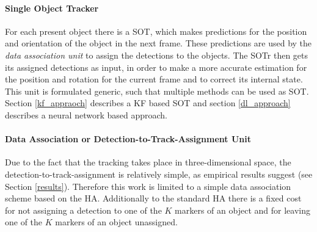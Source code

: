 \documentclass{article}
\begin{document}
\paragraph{Single Object Tracker} 
For each present object there is a SOT, which makes predictions for the position and orientation of the object in the next frame. These predictions are used by the \emph{data association unit} to assign the detections to the objects. The SOTr then gets its assigned detections as input, in order to make a more accurate estimation for the position and rotation for the current frame and to correct its internal state.\\
This unit is formulated generic, such that multiple methods can be used as SOT. Section \ref{kf_appraoch} describes a KF based SOT and section \ref{dl_approach} describes a neural network based approach.

\paragraph{Data Association or Detection-to-Track-Assignment Unit} 
Due to the fact that the tracking takes place in three-dimensional space, the detection-to-track-assignment is relatively simple, as  empirical results suggest (see Section \ref{results}). Therefore this work is limited to a simple data association scheme based on the HA. Additionally to the standard HA there is a fixed cost for not assigning a detection to one of the $K$ markers of an object and for leaving one of the $K$ markers of an object unassigned.
\end{document}
